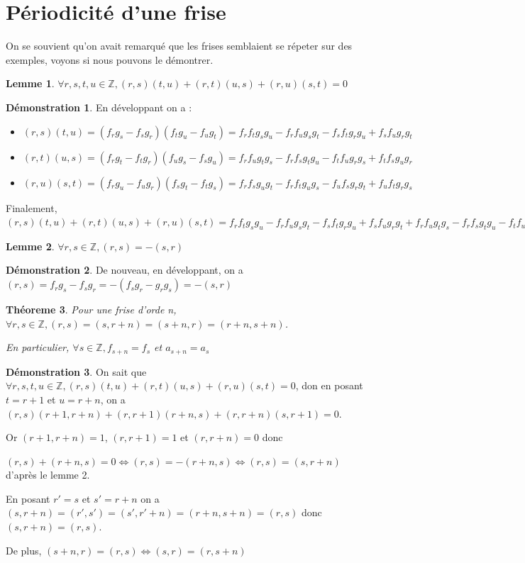 \documentclass[a4paper]{article}
\theoremstyle{plain}
\newtheorem{thm}{Théoreme}[section]
\newtheorem{lem}[thm]{Lemme}
\theoremstyle{definition}
\theoremstyle{proof}
\newtheorem{dem}{Démonstration}
\theoremstyle{remark}
\begin{document}
\section{Périodicité d'une frise}
On se souvient qu'on avait remarqué que les frises semblaient se répeter sur des exemples, voyons si nous pouvons le démontrer.

\begin{lem}
$\forall r,s,t,u \in \mathbb{Z}, (r,s)(t,u)+(r,t)(u,s)+(r,u)(s,t)=0$
\end{lem}

\begin{dem}
En développant on a : 
\begin{itemize}
\item $(r,s)(t,u)=(f_rg_s-f_sg_r)(f_tg_u-f_ug_t)=f_rf_tg_sg_u-f_rf_ug_sg_t-f_sf_tg_rg_u+f_sf_ug_rg_t$
\item $(r,t)(u,s)=(f_rg_t-f_tg_r)(f_ug_s-f_sg_u)=f_rf_ug_tg_s-f_rf_sg_tg_u-f_tf_ug_rg_s+f_tf_sg_ug_r$
\item $(r,u)(s,t)=(f_rg_u-f_ug_r)(f_sg_t-f_tg_s)=f_rf_sg_ug_t-f_rf_tg_ug_s-f_uf_sg_rg_t+f_uf_tg_rg_s$
\end{itemize}
Finalement, $(r,s)(t,u)+(r,t)(u,s)+(r,u)(s,t)=f_rf_tg_sg_u-f_rf_ug_sg_t-f_sf_tg_rg_u+f_sf_ug_rg_t+f_rf_ug_tg_s-f_rf_sg_tg_u-f_tf_ug_rg_s+f_tf_sg_ug_r+f_rf_sg_ug_t-f_rf_tg_ug_s-f_uf_sg_rg_t+f_uf_tg_rg_s=0$
\end{dem}

\begin{lem}
$\forall r,s \in \mathbb{Z}, (r,s)=-(s,r)$
\end{lem}
\begin{dem}
De nouveau, en développant, on a $(r,s)=f_rg_s-f_sg_r=-(f_sg_r-g_rg_s)=-(s,r)$
\end{dem}

\begin{thm}
Pour une frise d'orde n, $\forall r,s \in \mathbb{Z}, (r,s)=(s,r+n)=(s+n,r)=(r+n,s+n)$.

En particulier, $\forall s \in \mathbb{Z}, f_{s+n}=f_s$ et $a_{s+n}=a_s$ 
\end{thm}
\begin{dem}
On sait que $\forall r,s,t,u \in \mathbb{Z}, (r,s)(t,u)+(r,t)(u,s)+(r,u)(s,t)=0$, don en posant $t=r+1$ et $u=r+n$, on a $(r,s)(r+1,r+n)+(r,r+1)(r+n,s)+(r,r+n)(s,r+1)=0$.

Or $(r+1,r+n)=1$, $(r,r+1)=1$ et $(r,r+n)=0$ donc 

$(r,s)+(r+n,s)=0 \Leftrightarrow (r,s)=-(r+n,s) \Leftrightarrow (r,s)=(s,r+n)$ d'après le lemme 2.

En posant $r'=s$ et $s'=r+n$ on a $(s,r+n)=(r',s')=(s',r'+n)=(r+n,s+n)=(r,s)$ donc $(s,r+n)=(r,s)$.

De plus, $(s+n,r)=(r,s) \Leftrightarrow (s,r)=(r,s+n)$
\end{dem}
\end{document}
